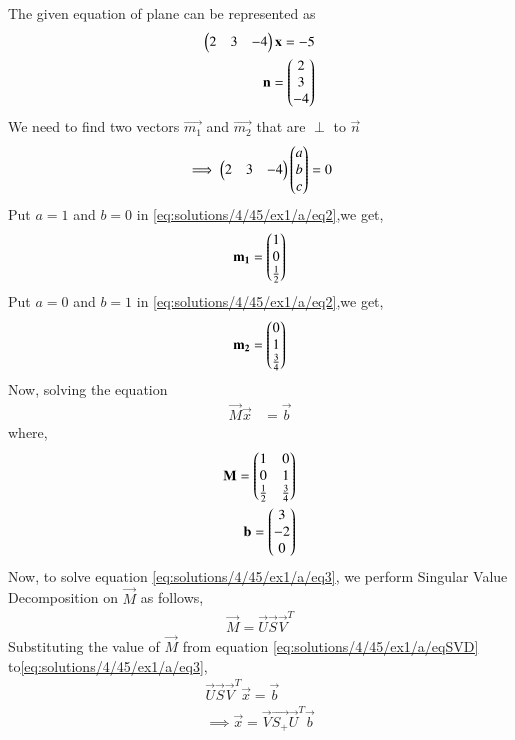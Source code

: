 The given equation of plane can be represented as
\begin{align}
    \myvec{2 & 3 & -4}\Vec{x}=-5\label{eq:solutions/4/45/ex1/a/eq1}\\
    \vec{n}=\myvec{2\\3\\-4}
\end{align}
We need to find two vectors $\vec{m_1}$ and $\Vec{m_2}$ that are $\perp$ to $\vec{n}$
\begin{align}\label{eq:solutions/4/45/ex1/a/eq2}
	\implies\begin{pmatrix}2 & 3 & -4\end{pmatrix}\begin{pmatrix}a\\b\\c\end{pmatrix} = 0
\end{align}
Put $a=1$ and $b=0$ in \eqref{eq:solutions/4/45/ex1/a/eq2},we get,
\begin{align}
    \Vec{m_1}=\myvec{1\\0\\\frac{1}{2}}
\end{align}
Put $a=0$ and $b=1$ in \eqref{eq:solutions/4/45/ex1/a/eq2},we get,
\begin{align}
    \Vec{m_2}=\myvec{0\\1\\\frac{3}{4}}
\end{align}
Now, solving the equation
\begin{align}
	\label{eq:solutions/4/45/ex1/a/eq3}\vec{M}\Vec{x} &= \vec{b}
\end{align}
where,
\begin{align}
\Vec{M}=\myvec{1&0\\0&1\\\frac{1}{2}&\frac{3}{4}}&\\
    \vec{b}=\myvec{3\\-2\\0}&
\end{align}
Now, to solve equation \eqref{eq:solutions/4/45/ex1/a/eq3}, we perform Singular Value Decomposition on $\vec{M}$ as follows,
\begin{align}
\vec{M}=\vec{U}\vec{S}\vec{V}^T\label{eq:solutions/4/45/ex1/a/eqSVD}
\end{align}
Substituting the value of $\Vec{M}$ from equation \eqref{eq:solutions/4/45/ex1/a/eqSVD} to\eqref{eq:solutions/4/45/ex1/a/eq3},
\begin{align}
    \vec{U}\vec{S}\vec{V}^T\Vec{x}=\vec{b}\\
    \implies \vec{x}=\vec{V}\vec{S_+}\vec{U}^T\Vec{b} \label{eq:solutions/4/45/ex1/a/eqX}
\end{align}
